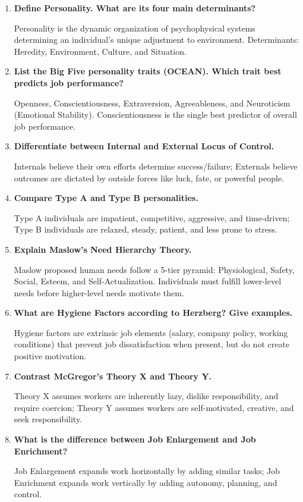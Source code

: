 \documentclass[11pt,a4paper]{article}
\newcommand{\Q}[1]{\textbf{#1}\par\noindent\ignorespaces}
\begin{document}
\begin{tcolorbox}[exambox, title={\textbf{Frequently Asked / Viva Questions}}]
\begin{enumerate}[leftmargin=*, itemsep=4pt]
  \item \Q{Define Personality. What are its four main determinants?}
    Personality is the dynamic organization of psychophysical systems determining an individual's unique adjustment to environment. Determinants: Heredity, Environment, Culture, and Situation.
  
  \item \Q{List the Big Five personality traits (OCEAN). Which trait best predicts job performance?}
    Openness, Conscientiousness, Extraversion, Agreeableness, and Neuroticism (Emotional Stability). Conscientiousness is the single best predictor of overall job performance.
  
  \item \Q{Differentiate between Internal and External Locus of Control.}
    Internals believe their own efforts determine success/failure; Externals believe outcomes are dictated by outside forces like luck, fate, or powerful people.
  
  \item \Q{Compare Type A and Type B personalities.}
    Type A individuals are impatient, competitive, aggressive, and time-driven; Type B individuals are relaxed, steady, patient, and less prone to stress.
  
  \item \Q{Explain Maslow's Need Hierarchy Theory.}
    Maslow proposed human needs follow a 5-tier pyramid: Physiological, Safety, Social, Esteem, and Self-Actualization. Individuals must fulfill lower-level needs before higher-level needs motivate them.
  
  \item \Q{What are Hygiene Factors according to Herzberg? Give examples.}
    Hygiene factors are extrinsic job elements (salary, company policy, working conditions) that prevent job dissatisfaction when present, but do not create positive motivation.
  
  \item \Q{Contrast McGregor's Theory X and Theory Y.}
    Theory X assumes workers are inherently lazy, dislike responsibility, and require coercion; Theory Y assumes workers are self-motivated, creative, and seek responsibility.
  
  \item \Q{What is the difference between Job Enlargement and Job Enrichment?}
    Job Enlargement expands work horizontally by adding similar tasks; Job Enrichment expands work vertically by adding autonomy, planning, and control.
  

\end{enumerate}
\end{tcolorbox}
\end{document}
